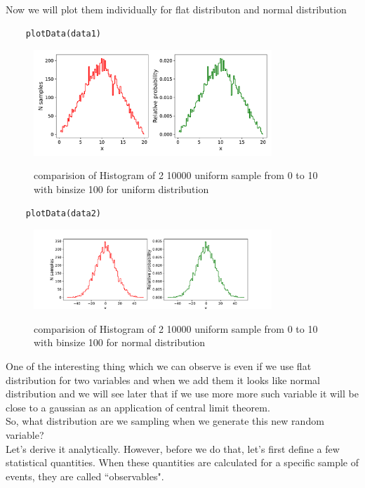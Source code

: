 \documentclass[a4paper,13pt]{report}
\begin{document}
Now we will plot them individually for flat distributon and normal distribution
\begin{verbatim}
	plotData(data1)
\end{verbatim}
 \begin{figure}[h!]
	\centering
	\includegraphics[width=0.8\textwidth]{../lec1pic3.pdf}
	\label{l1p3}
	\caption{comparision of Histogram of 2 10000 uniform sample from 0 to 10 with binsize 100 for uniform distribution}
\end{figure}
\begin{verbatim}
	plotData(data2)
\end{verbatim}
\begin{figure}[h!]
	\centering
	\includegraphics[width=0.8\textwidth]{../lec1pic4.pdf}
	\label{l1p4}
	\caption{comparision of Histogram of 2 10000 uniform sample from 0 to 10 with binsize 100 for normal distribution}
\end{figure}
One of the interesting thing which we can observe is even if we use flat distribution for two variables and when we add them it looks like normal distribution and we will see later that if we use more more such variable it will be close to a gaussian as an application of central limit theorem.\\
So, what distribution are we sampling when we generate this new random variable? \\

Let's derive it analytically. However, before we do that, let's first define a few statistical quantities. When these quantities are calculated for a specific sample of events, they are called ``observables". \\
\end{document}
